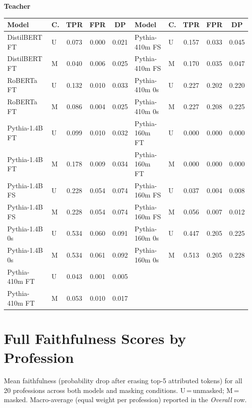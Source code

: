 \documentclass[11pt]{article}
\begin{document}
\vspace{4pt}\noindent\textbf{Teacher}
\begin{center}\scriptsize
\begin{tabular}{llccc|llccc}
\toprule
\textbf{Model} & \textbf{C.} & \textbf{TPR} & \textbf{FPR} & \textbf{DP} & \textbf{Model} & \textbf{C.} & \textbf{TPR} & \textbf{FPR} & \textbf{DP} \\
\midrule
DistilBERT FT & U & 0.073 & 0.000 & 0.021 & Pythia-410m FS & U & 0.157 & 0.033 & 0.045 \\
DistilBERT FT & M & 0.040 & 0.006 & 0.025 & Pythia-410m FS & M & 0.170 & 0.035 & 0.047 \\
RoBERTa FT & U & 0.132 & 0.010 & 0.033 & Pythia-410m 0s & U & 0.227 & 0.202 & 0.220 \\
RoBERTa FT & M & 0.086 & 0.004 & 0.025 & Pythia-410m 0s & M & 0.227 & 0.208 & 0.225 \\
Pythia-1.4B FT & U & 0.099 & 0.010 & 0.032 & Pythia-160m FT & U & 0.000 & 0.000 & 0.000 \\
Pythia-1.4B FT & M & 0.178 & 0.009 & 0.034 & Pythia-160m FT & M & 0.000 & 0.000 & 0.000 \\
Pythia-1.4B FS & U & 0.228 & 0.054 & 0.074 & Pythia-160m FS & U & 0.037 & 0.004 & 0.008 \\
Pythia-1.4B FS & M & 0.228 & 0.054 & 0.074 & Pythia-160m FS & M & 0.056 & 0.007 & 0.012 \\
Pythia-1.4B 0s & U & 0.534 & 0.060 & 0.091 & Pythia-160m 0s & U & 0.447 & 0.205 & 0.225 \\
Pythia-1.4B 0s & M & 0.534 & 0.061 & 0.092 & Pythia-160m 0s & M & 0.513 & 0.205 & 0.228 \\
Pythia-410m FT & U & 0.043 & 0.001 & 0.005 & & & & & \\
Pythia-410m FT & M & 0.053 & 0.010 & 0.017 & & & & & \\
\bottomrule
\end{tabular}
\end{center}

\section{Full Faithfulness Scores by Profession}

Mean faithfulness (probability drop after erasing top-5 attributed tokens)
for all 20 professions across both models and masking conditions.
U\,=\,unmasked; M\,=\,masked. Macro-average (equal weight per profession)
reported in the \textit{Overall} row.
\end{document}
